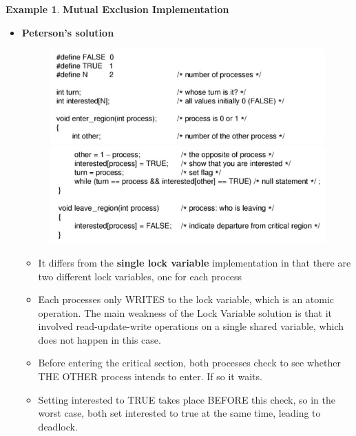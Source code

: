 \documentclass[12pt,a4paper]{article}
\theoremstyle{definition}
\newtheorem{example}{Example}[section]
\newenvironment{myitemize}
{ \begin{itemize}
    \setlength{\itemsep}{5pt}
    \setlength{\parskip}{0pt}
    \setlength{\parsep}{0pt}     }
{ \end{itemize}                  }
\begin{document}
\begin{example}{\textbf{Mutual Exclusion Implementation}}
\begin{myitemize}
\begin{myitemize}
\begin{myitemize}
			\end{myitemize}
			\item \textbf{Peterson's solution}
			\begin{figure}[!h]
				\includegraphics[scale=0.45]{m1/peterson1}
				\includegraphics[scale=0.45]{m1/peterson2}
			\end{figure}
			\begin{myitemize}
				\item It differs from the \textbf{single lock variable} implementation in that there are two different lock variables, one for each process
				\item Each processes only WRITES to the lock variable, which is an atomic operation. The main weakness of the Lock Variable solution is that it involved read-update-write operations on a single shared variable, which does not happen in this case.
				\item Before entering the critical section, both processes check to see whether THE OTHER process intends to enter. If so it waits.
				\item Setting interested to TRUE takes place BEFORE this check, so in the worst case, both set interested to true at the same time, leading to deadlock. 
			\end{myitemize}


\end{myitemize}
\end{myitemize}
\end{example}
\end{document}
